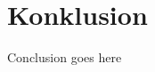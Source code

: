 \thispagestyle{fancy}
\chapter{Konklusion}
\label{chp:konklusion}
Conclusion goes here
\label{SidsteSide}